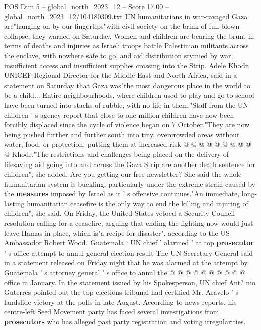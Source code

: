 \begin{textsample}{POS Dim 5 – global\_north\_2023\_12 – Score 17.00 – global\_north\_2023\_12/104180309.txt}  \label{ex:f5_pos_395}
UN humanitarians in war-ravaged Gaza are"hanging on by our fingertips"with civil society on the brink of full-blown collapse, they warned on Saturday.
Women and children are bearing the brunt in terms of deaths and injuries as Israeli troops battle Palestinian militants across the enclave, with nowhere safe to go, and aid distribution stymied by war, insufficient access and insufficient supplies crossing into the Strip.
Adele Khodr, UNICEF Regional Director for the Middle East and North Africa, said in a statement on Saturday that Gaza was"the most dangerous place in the world to be a child...
Entire neighbourhoods, where children used to play and go to school have been turned into stacks of rubble, with no life in them."Staff from the UN children ' s agency report that close to one million children have now been forcibly displaced since the cycle of violence began on 7 October."They are now being pushed further and further south into tiny, overcrowded areas without water, food, or protection, putting them at increased risk @ @ @ @ @ @ @ @ @ @ Khodr."The restrictions and challenges being placed on the delivery of lifesaving aid going into and across the Gaza Strip are another death sentence for children", she added.
Are you getting our free newsletter?
She said the whole humanitarian system is buckling, particularly under the extreme strain caused by the \textbf{measures} imposed by Israel as it ' s offensive continues."An immediate, long-lasting humanitarian ceasefire is the only way to end the killing and injuring of children", she said.
On Friday, the United States vetoed a Security Council resolution calling for a ceasefire, arguing that ending the fighting now would just leave Hamas in place, which is"a recipe for disaster", according to the US Ambassador Robert Wood.
Guatemala : UN chief ' alarmed ' at top \textbf{prosecutor} ' s office attempt to annul general election result The UN Secretary-General said in a statement released on Friday night that he was alarmed at the attempt by Guatemala ' s attorney general ' s office to annul the @ @ @ @ @ @ @ @ @ @ office in January.
In the statement issued by his Spokesperson, UN chief Ant? nio Guterres pointed out the top elections tribunal had certified Mr.
Aravelo ' s landslide victory at the polls in late August.
According to news reports, his centre-left Seed Movement party has faced several investigations from \textbf{prosecutors} who has alleged past party registration and voting irregularities.

\end{textsample}
